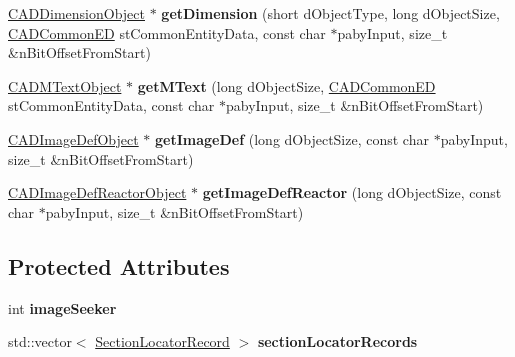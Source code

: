 \begin{DoxyCompactItemize}
\item 
\hyperlink{class_c_a_d_dimension_object}{C\+A\+D\+Dimension\+Object} $\ast$ {\bfseries get\+Dimension} (short d\+Object\+Type, long d\+Object\+Size, \hyperlink{struct_c_a_d_common_e_d}{C\+A\+D\+Common\+ED} st\+Common\+Entity\+Data, const char $\ast$paby\+Input, size\+\_\+t \&n\+Bit\+Offset\+From\+Start)\hypertarget{class_d_w_g_file_r2000_a01861465a16717d6382b5ff0976af488}{}\label{class_d_w_g_file_r2000_a01861465a16717d6382b5ff0976af488}

\item 
\hyperlink{class_c_a_d_m_text_object}{C\+A\+D\+M\+Text\+Object} $\ast$ {\bfseries get\+M\+Text} (long d\+Object\+Size, \hyperlink{struct_c_a_d_common_e_d}{C\+A\+D\+Common\+ED} st\+Common\+Entity\+Data, const char $\ast$paby\+Input, size\+\_\+t \&n\+Bit\+Offset\+From\+Start)\hypertarget{class_d_w_g_file_r2000_aa10e0d19734b469b2d3f12b91189eec6}{}\label{class_d_w_g_file_r2000_aa10e0d19734b469b2d3f12b91189eec6}

\item 
\hyperlink{class_c_a_d_image_def_object}{C\+A\+D\+Image\+Def\+Object} $\ast$ {\bfseries get\+Image\+Def} (long d\+Object\+Size, const char $\ast$paby\+Input, size\+\_\+t \&n\+Bit\+Offset\+From\+Start)\hypertarget{class_d_w_g_file_r2000_ab3673fda114007677ed2c33b16504cf6}{}\label{class_d_w_g_file_r2000_ab3673fda114007677ed2c33b16504cf6}

\item 
\hyperlink{class_c_a_d_image_def_reactor_object}{C\+A\+D\+Image\+Def\+Reactor\+Object} $\ast$ {\bfseries get\+Image\+Def\+Reactor} (long d\+Object\+Size, const char $\ast$paby\+Input, size\+\_\+t \&n\+Bit\+Offset\+From\+Start)\hypertarget{class_d_w_g_file_r2000_a193022572da401fb72343c55bb1c55d1}{}\label{class_d_w_g_file_r2000_a193022572da401fb72343c55bb1c55d1}

\end{DoxyCompactItemize}
\subsection*{Protected Attributes}
\begin{DoxyCompactItemize}
\item 
int {\bfseries image\+Seeker}\hypertarget{class_d_w_g_file_r2000_a146140c0a6eb9da3b0b196a3feeef11a}{}\label{class_d_w_g_file_r2000_a146140c0a6eb9da3b0b196a3feeef11a}

\item 
std\+::vector$<$ \hyperlink{struct_section_locator_record}{Section\+Locator\+Record} $>$ {\bfseries section\+Locator\+Records}\hypertarget{class_d_w_g_file_r2000_a2d55b43d3610308eead999e88a2ec564}{}\label{class_d_w_g_file_r2000_a2d55b43d3610308eead999e88a2ec564}

\end{DoxyCompactItemize}
